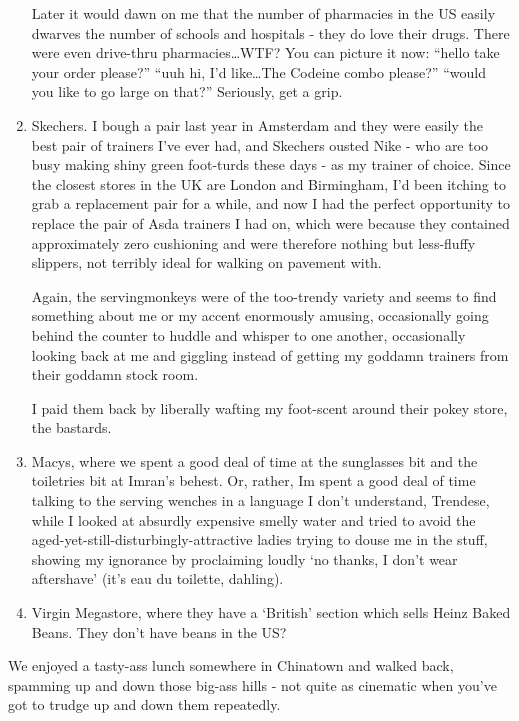 \documentclass[b5paper,11pt,titlepage,draft]{book}
\begin{document}
\begin{enumerate}
Later it would dawn on me that the number of pharmacies in the US easily dwarves the number of schools and hospitals - they do love their drugs.  There were even drive-thru pharmacies\ldots WTF?  You can picture it now: ``hello take your order please?'' ``uuh hi, I'd like\ldots The Codeine combo please?'' ``would you like to go large on that?''  Seriously, get a grip.

\item Skechers.  I bough a pair last year in Amsterdam and they were easily the best pair of trainers I've ever had, and Skechers ousted Nike - who are too busy making shiny green foot-turds these days - as my trainer of choice.  Since the closest stores in the UK are London and Birmingham, I'd been itching to grab a replacement pair for a while, and now I had the perfect opportunity to replace the pair of  Asda trainers I had on, which were  because they contained approximately zero cushioning and were therefore nothing but less-fluffy slippers, not terribly ideal for walking on pavement with.

Again, the servingmonkeys were of the too-trendy variety and seems to find something about me or my accent enormously amusing, occasionally going behind the counter to huddle and whisper to one another, occasionally looking back at me and giggling instead of getting my goddamn trainers from their goddamn stock room.

I paid them back by liberally wafting my foot-scent around their pokey store, the bastards.

\item Macys, where we spent a good deal of time at the sunglasses bit and the toiletries bit at Imran's behest.  Or, rather, Im spent a good deal of time talking to the serving wenches in a language I don't understand, Trendese, while I looked at absurdly expensive smelly water and tried to avoid the aged-yet-still-disturbingly-attractive ladies trying to douse me in the stuff, showing my ignorance by proclaiming loudly `no thanks, I don't wear aftershave' (it's eau du toilette, dahling).

\item Virgin Megastore, where they have a `British' section which sells Heinz Baked Beans.  They don't have beans in the US?
\end{enumerate}

We enjoyed a tasty-ass lunch somewhere in Chinatown and walked back, spamming up and down those big-ass hills - not quite as cinematic when you've got to trudge up and down them repeatedly.
\end{document}
